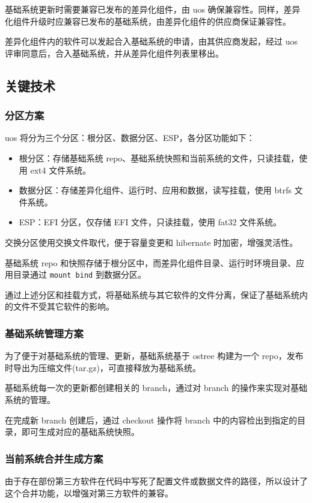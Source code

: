 \documentclass{utart}
\begin{document}
基础系统更新时需要兼容已发布的差异化组件，由 uos 确保兼容性。同样，差异化组件升级时应兼容已发布的基础系统，由差异化组件的供应商保证兼容性。

差异化组件内的软件可以发起合入基础系统的申请，由其供应商发起，经过 uos 评审同意后，合入基础系统，并从差异化组件列表里移出。

\subsection{关键技术}
\subsubsection{分区方案}
uos 将分为三个分区：根分区、数据分区、ESP，各分区功能如下：
\begin{itemize}[leftmargin=4em]
\item 根分区：存储基础系统 repo、基础系统快照和当前系统的文件，只读挂载，使用 ext4 文件系统。
\item 数据分区：存储差异化组件、运行时、应用和数据，读写挂载，使用 btrfs 文件系统。
\item ESP：EFI 分区，仅存储 EFI 文件，只读挂载，使用 fat32 文件系统。
\end{itemize}

交换分区使用交换文件取代，便于容量变更和 hibernate 时加密，增强灵活性。

基础系统 repo 和快照存储于根分区中，而差异化组件目录、运行时环境目录、应用目录通过 \texttt{mount bind} 到数据分区。

通过上述分区和挂载方式，将基础系统与其它软件的文件分离，保证了基础系统内的文件不受其它软件的影响。

\subsubsection{基础系统管理方案}
为了便于对基础系统的管理、更新，基础系统基于 ostree 构建为一个 repo，发布时导出为压缩文件(tar.gz)，可直接释放为基础系统。

基础系统每一次的更新都创建相关的 branch，通过对 branch 的操作来实现对基础系统的管理。

在完成新 branch 创建后，通过 checkout 操作将 branch 中的内容检出到指定的目录，即可生成对应的基础系统快照。

\subsubsection{当前系统合并生成方案}
由于存在部份第三方软件在代码中写死了配置文件或数据文件的路径，所以设计了这个合并功能，以增强对第三方软件的兼容。
\end{document}
